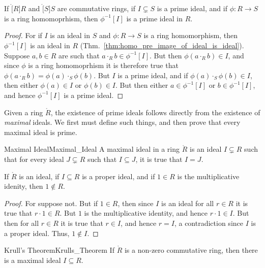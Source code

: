     \begin{theorem}
        If $\ring[R]{R}$ and $\ring[S]{S}$ are commutative rings, if
        $I\subsetneq{S}$ is a prime ideal, and if $\phi:R\rightarrow{S}$ is
        a ring homomoprhism, then $\phi^{\minus{1}}[I]$ is a prime ideal in
        $R$.
    \end{theorem}
    \begin{proof}
        For if $I$ is an ideal in $S$ and $\phi:R\rightarrow{S}$ is a ring
        homomorphism, then $\phi^{\minus{1}}[I]$ is an ideal in $R$
        (Thm.~\ref{thm:homo_pre_image_of_ideal_is_ideal}). Suppose
        $a,b\in{R}$ are such that $a\cdot_{R}b\in\phi^{\minus{1}}[I]$.
        But then $\phi(a\cdot_{R}b)\in{I}$, and since $\phi$ is a ring
        homomoprhism it is therefore true that
        $\phi(a\cdot_{R}b)=\phi(a)\cdot_{S}\phi(b)$. But $I$ is a prime
        ideal, and if $\phi(a)\cdot_{S}\phi(b)\in{I}$, then either
        $\phi(a)\in{I}$ or $\phi(b)\in{I}$. But then either
        $a\in\phi^{\minus{1}}[I]$ or $b\in\phi^{\minus{1}}[I]$, and hence
        $\phi^{\minus{1}}[I]$ is a prime ideal.
    \end{proof}
    Given a ring $\ring{R}$, the existence of prime ideals follows directly
    from the existence of \textit{maximal} ideals. We first must define such
    things, and then prove that every maximal ideal is prime.
    \begin{fdefinition}{Maximal Ideal}{Maximal_Ideal}
        A maximal ideal in a ring $\ring{R}$ is an ideal $I\subsetneq{R}$
        such that for every ideal $J\subsetneq{R}$ such that
        $I\subseteq{J}$, it is true that $I=J$.
    \end{fdefinition}
    \begin{theorem}
        \label{thm:Proper_Ideal_Does_Not_Contain_1}%
        If $\ring{R}$ is an ideal, if $I\subseteq{R}$ is a proper ideal, and
        if $1\in{R}$ is the multiplicative idenity, then $1\notin{R}$.
    \end{theorem}
    \begin{proof}
        For suppose not. But if $1\in{R}$, then since $I$ is an ideal for
        all $r\in{R}$ it is true that $r\cdot{1}\in{R}$. But $1$ is the
        multiplicative identity, and hence $r\cdot{1}\in{I}$. But then for
        all $r\in{R}$ it is true that $r\in{I}$, and hence $r=I$, a
        contradiction since $I$ is a proper ideal. Thus, $1\notin{I}$.
    \end{proof}
    \begin{ftheorem}{Krull's Theorem}{Krulls_Theorem}
        If $\ring{R}$ is a non-zero commutative ring, then there is a
        maximal ideal $I\subseteq{R}$.
    \end{ftheorem}
